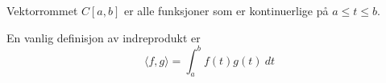 Vektorrommet $C[a,b]$ er alle funksjoner som er kontinuerlige på
$a \leq t \leq b$.

En vanlig definisjon av indreprodukt er
$$\langle f,g \rangle
  = \int_a^b f(t)g(t)\ dt$$
